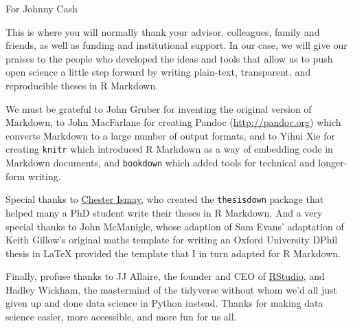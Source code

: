 \documentclass[a4paper, nobind]{templates/ociamthesis}
\begin{document}
%
\begin{romanpages}

\maketitle

\begin{dedication}
  For Johnny Cash
\end{dedication}

\begin{acknowledgements}
 	This is where you will normally thank your advisor, colleagues, family and friends, as well as funding and institutional support. In our case, we will give our praises to the people who developed the ideas and tools that allow us to push open science a little step forward by writing plain-text, transparent, and reproducible theses in R Markdown.

  We must be grateful to John Gruber for inventing the original version of Markdown, to John MacFarlane for creating Pandoc (\url{http://pandoc.org}) which converts Markdown to a large number of output formats, and to Yihui Xie for creating \texttt{knitr} which introduced R Markdown as a way of embedding code in Markdown documents, and \texttt{bookdown} which added tools for technical and longer-form writing.

  Special thanks to \href{http://chester.rbind.io}{Chester Ismay}, who created the \texttt{thesisdown} package that helped many a PhD student write their theses in R Markdown. And a very special thanks to John McManigle, whose adaption of Sam Evans' adaptation of Keith Gillow's original maths template for writing an Oxford University DPhil thesis in LaTeX provided the template that I in turn adapted for R Markdown.

  Finally, profuse thanks to JJ Allaire, the founder and CEO of \href{http://rstudio.com}{RStudio}, and Hadley Wickham, the mastermind of the tidyverse without whom we'd all just given up and done data science in Python instead. Thanks for making data science easier, more accessible, and more fun for us all.


\end{acknowledgements}
\end{romanpages}
\end{document}
